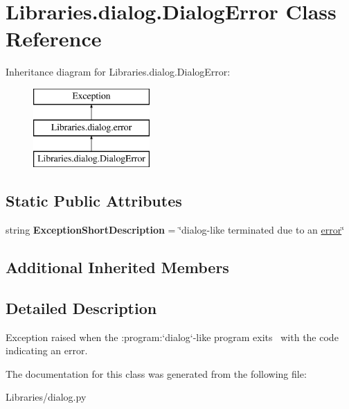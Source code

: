 \hypertarget{class_libraries_1_1dialog_1_1_dialog_error}{}\section{Libraries.\+dialog.\+Dialog\+Error Class Reference}
\label{class_libraries_1_1dialog_1_1_dialog_error}
Inheritance diagram for Libraries.\+dialog.\+Dialog\+Error\+:\begin{figure}[H]
\begin{center}
\leavevmode
\includegraphics[height=3.000000cm]{class_libraries_1_1dialog_1_1_dialog_error}
\end{center}
\end{figure}
\subsection*{Static Public Attributes}
\begin{DoxyCompactItemize}
\item 
string {\bfseries Exception\+Short\+Description} = \char`\"{}dialog-\/like terminated due to an \hyperlink{class_libraries_1_1dialog_1_1error}{error}\char`\"{}\hypertarget{class_libraries_1_1dialog_1_1_dialog_error_a77818258a7c2d7de07b3c513db4abfb3}{}\label{class_libraries_1_1dialog_1_1_dialog_error_a77818258a7c2d7de07b3c513db4abfb3}

\end{DoxyCompactItemize}
\subsection*{Additional Inherited Members}


\subsection{Detailed Description}
\begin{DoxyVerb}Exception raised when the :program:`dialog`-like program exits \
with the code indicating an error.\end{DoxyVerb}
 

The documentation for this class was generated from the following file\+:\begin{DoxyCompactItemize}
\item 
Libraries/dialog.\+py\end{DoxyCompactItemize}
